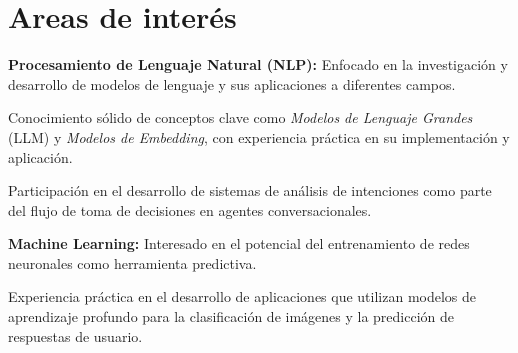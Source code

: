 \section{Areas de interés}

\begin{onecolentry}
    \textbf{Procesamiento de Lenguaje Natural (NLP):} Enfocado en la investigación y desarrollo de modelos de lenguaje y sus aplicaciones a diferentes campos.
    \begin{highlights}
        \item Conocimiento sólido de conceptos clave como \textit{Modelos de Lenguaje Grandes} (LLM) y \textit{Modelos de Embedding}, con experiencia práctica en su implementación y aplicación.
        \item Participación en el desarrollo de sistemas de análisis de intenciones como parte del flujo de toma de decisiones en agentes conversacionales.
    \end{highlights}
\end{onecolentry}

\begin{onecolentry}
    \textbf{Machine Learning:} Interesado en el potencial del entrenamiento de redes neuronales como herramienta predictiva.  
    \begin{highlights}
        \item Experiencia práctica en el desarrollo de aplicaciones que utilizan modelos de aprendizaje profundo para la clasificación de imágenes y la predicción de respuestas de usuario.  
    \end{highlights}
\end{onecolentry}